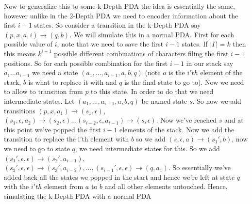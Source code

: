 \documentclass[11pt]{article}
\begin{document}
\begin{enumerate}
\begin{answer}
  \vspace{1em}
  Now to generalize this to some k-Depth PDA the idea is essentially the same, however unlike in the 2-Depth PDA we need to encoder information about the first $i - 1$ states. So consider a transition in the k-Depth PDA say $(p, x, a, i) \to (q, b)$. We will simulate this in a normal PDA. First for each possible value of $i$, note that we need to save the first $i - 1$ states. If $|\Gamma| = k$ then this means $k^{i - 1}$ possible different combinations of characters filing the first $i - 1$ positions. So for each possible combination for the first $i - 1$ in our stack say $a_{1}\dots a_{i - 1}$ we need a state $(a_{1}, \dots, a_{i - 1}, a, b, q)$ (note $a$ is the $i'th$ element of the stack, $b$ is what to replace it with and $q$ is the final state to go to). Now we need to allow to transition from $p$ to this state. In order to do that we need intermediate states. Let $(a_{1}, \dots, a_{i - 1}, a, b, q)$ be named state $s$. So now we add transitions $(p, x, a_{1}) \to (s_{1}, \epsilon)$, $(s_{1}, \epsilon, a_{2}) \to (s_{2}, \epsilon) \dots (s_{i - 2}, \epsilon, a_{i - 1}) \to (s, \epsilon)$. Now we've reached $s$ and at this point we've popped the first $i -1 $ elements of the stack. Now we add the transition to replace the i'th element with $b$ so we add $(s, \epsilon, a) \to (s_{1}', b)$, now we need to go to state $q$, we need intermediate states for this. So we add $(s_{1}', \epsilon, \epsilon) \to (s_{2}', a_{i - 1})$, $(s_{2}', \epsilon, \epsilon) \to (s_{3}', a_{i - 2}), \dots, (s_{i - 1}', \epsilon, \epsilon) \to (q, a_1)$. So essentially we've added back all the states we popped in the start and hence we're left at state $q$ with the $i'th$ element from $a$ to $b$ and all other elements untouched. Hence, simulating the k-Depth PDA with a normal PDA
    
\end{answer}

\end{enumerate}
\end{document}
